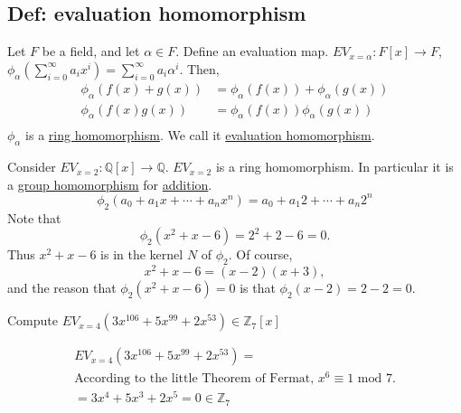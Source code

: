 \documentclass[11pt]{elegantbook}
\begin{document}
\subsection{Def: evaluation homomorphism}
\begin{definition}
    Let $F$ be a field, and let $\alpha\in F$. Define an evaluation map. $EV_{x=\alpha}:F[x] \rightarrow F$, $\phi_\alpha(\sum_{i=0}^\infty a_ix^i)=\sum_{i=0}^\infty a_i\alpha^i$. Then,
    \begin{equation}
        \begin{aligned}
            \phi_\alpha(f(x)+g(x))&=\phi_\alpha(f(x))+\phi_\alpha(g(x))\\
            \phi_\alpha(f(x)g(x))&=\phi_\alpha(f(x))\phi_\alpha(g(x))\\
        \end{aligned}
        \nonumber
    \end{equation}
    $\phi_\alpha$ is a \underline{ring homomorphism}. We call it \underline{evaluation homomorphism}.
\end{definition}

\begin{example}
    Consider $EV_{x=2}: \mathbb{Q}[x] \rightarrow \mathbb{Q}$. $EV_{x=2}$ is a ring homomorphism. In particular it is a \underline{group homomorphism} for \underline{addition}.
    $$
    \phi_{2}\left(a_{0}+a_{1} x+\cdots+a_{n} x^{n}\right)=a_{0}+a_{1} 2+\cdots+a_{n} 2^{n}
    $$
    Note that
    $$
    \phi_{2}\left(x^{2}+x-6\right)=2^{2}+2-6=0 .
    $$
    Thus $x^{2}+x-6$ is in the kernel $N$ of $\phi_{2}$. Of course,
    $$
    x^{2}+x-6=(x-2)(x+3),
    $$
    and the reason that $\phi_{2}\left(x^{2}+x-6\right)=0$ is that $\phi_{2}(x-2)=2-2=0$.
\end{example}

\begin{example}
    Compute $EV_{x=4}(3x^{106}+5x^{99}+2x^{53})\in \mathbb{Z}_7[x]$

    \begin{equation}
        \begin{aligned}
            EV_{x=4}(3x^{106}+5x^{99}+2x^{53})=\\
            \text{According to the little Theorem of Fermat, $x^6\equiv 1 \text{ mod }7$.}\\
            =3x^4+5x^3+2x^5=0\in \mathbb{Z}_7
        \end{aligned}
        \nonumber
    \end{equation}
\end{example}
\end{document}
